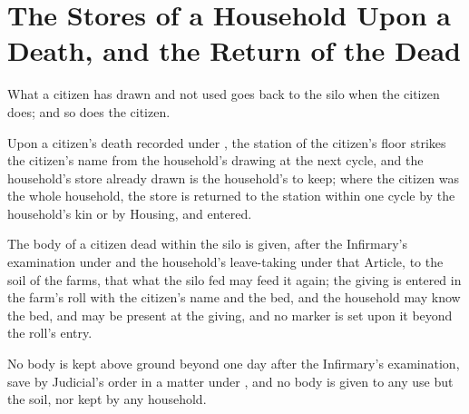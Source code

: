 \section{The Stores of a Household Upon a Death, and the Return of the Dead}
\label{sec:supply:stores-of-a-household-upon-a-death-and-the-return-of-the-dead}

What a citizen has drawn and not used goes back to the silo when the citizen does; and so does the citizen.

\begin{clauses}
\item Upon a citizen's death recorded under , the station of the citizen's floor strikes the citizen's name from the household's drawing at the next cycle, and the household's store already drawn is the household's to keep; where the citizen was the whole household, the store is returned to the station within one cycle by the household's kin or by Housing, and entered.
\item The body of a citizen dead within the silo is given, after the Infirmary's examination under  and the household's leave-taking under that Article, to the soil of the farms, that what the silo fed may feed it again; the giving is entered in the farm's roll with the citizen's name and the bed, and the household may know the bed, and may be present at the giving, and no marker is set upon it beyond the roll's entry.
\item No body is kept above ground beyond one day after the Infirmary's examination, save by Judicial's order in a matter under , and no body is given to any use but the soil, nor kept by any household.
\end{clauses}
